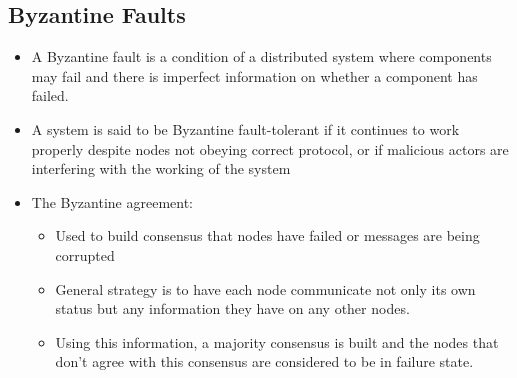 \documentclass{article}
\begin{document}
\subsection{Byzantine Faults}
\begin{itemize}
    \item A Byzantine fault is a condition of a distributed system where components may fail and there is imperfect information on whether a component has failed. 
    
    \item A system is said to be Byzantine fault-tolerant if it continues to work properly despite nodes not obeying correct protocol, or if malicious actors are interfering with the working of the system
    
    \item The Byzantine agreement:
    \begin{itemize}
        \item Used to build consensus that nodes have failed or messages are being corrupted
        
        \item General strategy is to have each node communicate not only its own status but any information they have on any other nodes. 
        
        \item Using this information, a majority consensus is built and the nodes that don't agree with this consensus are considered to be in failure state.
    \end{itemize}
\end{itemize}
\end{document}

